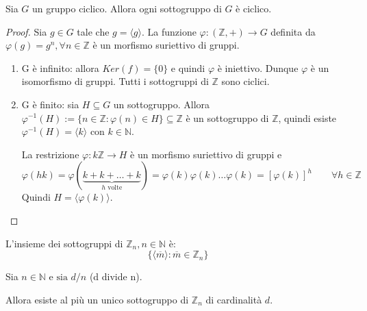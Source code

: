 \documentclass[../main.tex]{subfiles}
\begin{document}
\begin{theorem}
    Sia $G$ un gruppo ciclico. Allora ogni sottogruppo di $G$ è ciclico.
\end{theorem}

\begin{proof}
    Sia $g \in G$ tale che $g = \langle g \rangle$. La funzione $\varphi: (\mathbb{Z} , +) \rightarrow G$ definita da $\varphi(g) = g^n, \forall n \in \mathbb{Z}$ è un morfismo suriettivo di gruppi.
    \begin{enumerate}[label=\alph*)]
        \item G è infinito: allora $Ker(f) = \{0\}$ e quindi $\varphi$ è iniettivo. Dunque $\varphi$ è un
              isomorfismo di gruppi. Tutti i sottogruppi di $\mathbb{Z} $ sono ciclici.
        \item G è finito: sia $H \subseteq G$ un sottogruppo. Allora $\varphi^{-1}(H) := \{n \in \mathbb{Z} : \varphi(n) \in H\} \subseteq \mathbb{Z} $ è un sottogruppo di $\mathbb{Z} $, quindi esiste $\varphi^{-1}(H)= \langle k \rangle$ con $k \in \mathbb{N} $.

              La restrizione $\varphi: k \mathbb{Z} \rightarrow H$ è un morfismo suriettivo di gruppi e
              \begin{equation*}
                  \varphi(hk) = \varphi(\underbrace{k+k+\ldots+k}_{h \text{ volte}}) = \varphi(k) \varphi(k) \ldots \varphi(k) = [\varphi(k)]^h \qquad \forall h \in \mathbb{Z}
              \end{equation*}
              Quindi $H = \langle \varphi(k) \rangle$.
    \end{enumerate}
\end{proof}

\begin{corollary}
    L'insieme dei sottogruppi di $\mathbb{Z}_n , n \in \mathbb{N} $ è:
    \begin{equation*}
        \{\langle \overline{m} \rangle : \overline{m} \in \mathbb{Z}_n \}
    \end{equation*}
\end{corollary}

\begin{proposition}
    Sia $n \in \mathbb{N} \text{ e sia } d/n$ (d divide n).

    Allora esiste al più un unico sottogruppo di $\mathbb{Z}_n$ di cardinalità $d$.
\end{proposition}
\end{document}
